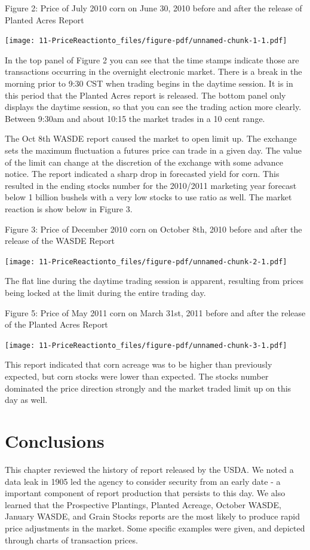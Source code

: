 \documentclass[
  letterpaper,
  DIV=11,
  numbers=noendperiod]{scrreprt}
\begin{document}
Figure 2: Price of July 2010 corn on June 30, 2010 before and after the
release of Planted Acres Report

\texttt{[image: 11-PriceReactionto\_files/figure-pdf/unnamed-chunk-1-1.pdf]}

In the top panel of Figure 2 you can see that the time stamps indicate
those are transactions occurring in the overnight electronic market.
There is a break in the morning prior to 9:30 CST when trading begins in
the daytime session. It is in this period that the Planted Acres report
is released. The bottom panel only displays the daytime session, so that
you can see the trading action more clearly. Between 9:30am and about
10:15 the market trades in a 10 cent range.

The Oct 8th WASDE report caused the market to open limit up. The
exchange sets the maximum fluctuation a futures price can trade in a
given day. The value of the limit can change at the discretion of the
exchange with some advance notice. The report indicated a sharp drop in
forecasted yield for corn. This resulted in the ending stocks number for
the 2010/2011 marketing year forecast below 1 billion bushels with a
very low stocks to use ratio as well. The market reaction is show below
in Figure 3.

Figure 3: Price of December 2010 corn on October 8th, 2010 before and
after the release of the WASDE Report

\texttt{[image: 11-PriceReactionto\_files/figure-pdf/unnamed-chunk-2-1.pdf]}

The flat line during the daytime trading session is apparent, resulting
from prices being locked at the limit during the entire trading day.

Figure 5: Price of May 2011 corn on March 31st, 2011 before and after
the release of the Planted Acres Report

\texttt{[image: 11-PriceReactionto\_files/figure-pdf/unnamed-chunk-3-1.pdf]}

This report indicated that corn acreage was to be higher than previously
expected, but corn stocks were lower than expected. The stocks number
dominated the price direction strongly and the market traded limit up on
this day as well.

\hypertarget{conclusions}{%
\section{Conclusions}\label{conclusions}}

This chapter reviewed the history of report released by the USDA. We
noted a data leak in 1905 led the agency to consider security from an
early date - a important component of report production that persists to
this day. We also learned that the Prospective Plantings, Planted
Acreage, October WASDE, January WASDE, and Grain Stocks reports are the
most likely to produce rapid price adjustments in the market. Some
specific examples were given, and depicted through charts of transaction
prices.
\end{document}
